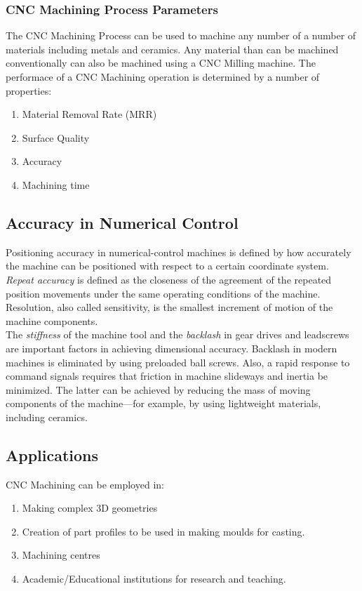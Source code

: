 \subsubsection{CNC Machining Process Parameters}
The CNC Machining Process can be used to machine any number of a number of materials including metals and ceramics. Any material than can be machined conventionally can also be machined using a CNC Milling machine.
The performace of a CNC Machining operation is determined by a number of properties:
\begin{enumerate}
	\item Material Removal Rate (MRR)
	\item Surface Quality
	\item Accuracy
	\item Machining time
\end{enumerate}
\subsection{Accuracy in Numerical Control}
Positioning accuracy in numerical-control machines is defined by how accurately the machine can be positioned with respect to a certain coordinate system. \textit{Repeat accuracy} is defined as the closeness of the agreement of the repeated position movements under the same operating conditions of the machine. Resolution, also called sensitivity, is the smallest increment of motion of the machine components.\\
The \textit{stiffness} of the machine tool and the \textit{backlash} in gear drives and leadscrews are important factors in achieving dimensional accuracy. Backlash in modern machines is eliminated by using preloaded ball screws. Also, a rapid response to command signals requires that friction in machine slideways and inertia be minimized. The latter can be achieved by reducing the mass of moving components of the machine—for example, by using lightweight materials, including ceramics.
\newpage
\subsection{Applications}
CNC Machining can be employed in:
\begin{enumerate}
	\item Making complex 3D geometries
	\item Creation of part profiles to be used in making moulds for casting.
	\item Machining centres
	\item Academic/Educational institutions for research and teaching.
\end{enumerate}
